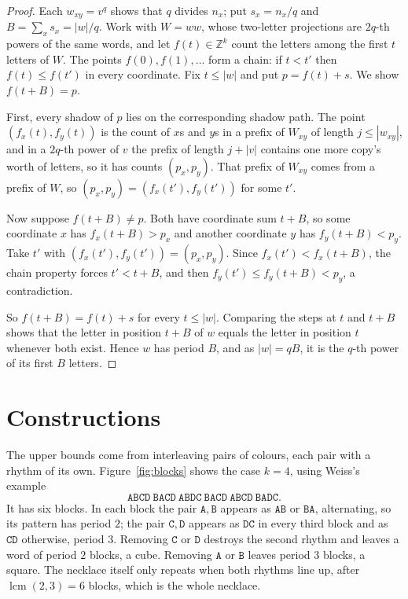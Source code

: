 \documentclass[11pt,a4paper]{article}
\theoremstyle{remark}
\begin{document}
\begin{proof}
Each $w_{xy}=v^q$ shows that $q$ divides $n_x$; put $s_x=n_x/q$ and
$B=\sum_x s_x=|w|/q$. Work with $W=ww$, whose two-letter projections are
$2q$-th powers of the same words, and let $f(t)\in\mathbb{Z}^k$ count the
letters among the first $t$ letters of $W$. The points $f(0),f(1),\dots$
form a chain: if $t<t'$ then $f(t)\le f(t')$ in every coordinate. Fix
$t\le|w|$ and put $p=f(t)+s$. We show $f(t+B)=p$.

First, every shadow of $p$ lies on the corresponding shadow path. The
point $(f_x(t),f_y(t))$ is the count of $x$s and $y$s in a prefix of
$W_{xy}$ of length $j\le|w_{xy}|$, and in a $2q$-th power of $v$ the
prefix of length $j+|v|$ contains one more copy's worth of letters, so it
has counts $(p_x,p_y)$. That prefix of $W_{xy}$ comes from a prefix of
$W$, so $(p_x,p_y)=(f_x(t'),f_y(t'))$ for some $t'$.

Now suppose $f(t+B)\ne p$. Both have coordinate sum $t+B$, so some
coordinate $x$ has $f_x(t+B)>p_x$ and another coordinate $y$ has
$f_y(t+B)<p_y$. Take $t'$ with $(f_x(t'),f_y(t'))=(p_x,p_y)$. Since
$f_x(t')<f_x(t+B)$, the chain property forces $t'<t+B$, and then
$f_y(t')\le f_y(t+B)<p_y$, a contradiction.

So $f(t+B)=f(t)+s$ for every $t\le|w|$. Comparing the steps at $t$ and
$t+B$ shows that the letter in position $t+B$ of $w$ equals the letter in
position $t$ whenever both exist. Hence $w$ has period $B$, and as
$|w|=qB$, it is the $q$-th power of its first $B$ letters.
\end{proof}

\section{Constructions}

The upper bounds come from interleaving pairs of colours, each pair with
a rhythm of its own. Figure~\ref{fig:blocks} shows the case $k=4$, using
Weiss's example
\[
\mathtt{ABCD\ BACD\ ABDC\ BACD\ ABCD\ BADC}.
\]
It has six blocks. In each block the pair $\mathtt{A},\mathtt{B}$ appears
as $\mathtt{AB}$ or $\mathtt{BA}$, alternating, so its pattern has period
$2$; the pair $\mathtt{C},\mathtt{D}$ appears as $\mathtt{DC}$ in every
third block and as $\mathtt{CD}$ otherwise, period $3$. Removing $\mathtt{C}$ or
$\mathtt{D}$ destroys the second rhythm and leaves a word of period $2$
blocks, a cube. Removing $\mathtt{A}$ or $\mathtt{B}$ leaves period $3$
blocks, a square. The necklace itself only repeats when both rhythms
line up, after $\operatorname{lcm}(2,3)=6$ blocks, which is the whole
necklace.
\end{document}
